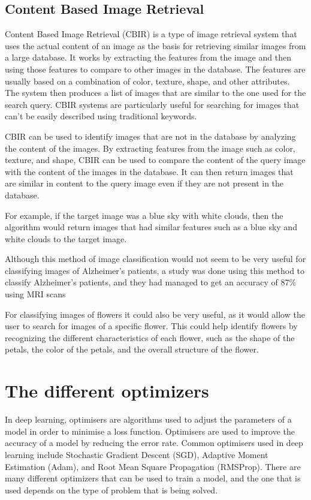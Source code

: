 \documentclass[]{final_report}
\begin{document}
\subsection{Content Based Image Retrieval}
Content Based Image Retrieval (CBIR) is a type of image retrieval system that uses the actual content of an image as the basis for retrieving similar 
images from a large database. It works by extracting the features from the image and then using those features to compare to other images in the database.
The features are usually based on a combination of color, texture, shape, and other attributes. The system then produces a list of images that are similar 
to the one used for the search query. CBIR systems are particularly useful for searching for images that can't be easily described using traditional keywords.

CBIR can be used to identify images that are not in the database by analyzing the content of the images. 
By extracting features from the image such as color, texture, and shape, CBIR can be used to compare the 
content of the query image with the content of the images in the database. It can then return images that are 
similar in content to the query image even if they are not present in the database. 

For example, if the target image was a blue sky with white clouds, then the algorithm would return 
images that had similar features such as a blue sky and white clouds to the target image.

Although this method of image classification would not seem to be very useful for classifying images of Alzheimer's patients, 
a study was done using this method to classify Alzheimer's patients, and they had managed to get an accuracy of 87\% using MRI scans\cite{5972513}

For classifying images of flowers it could also be very useful, as it would allow the user to search for images of a specific flower.
This could help identify flowers by recognizing the different characteristics of each flower, such as the shape of the petals, 
the color of the petals, and the overall structure of the flower.

\section{The different optimizers}

In deep learning, optimisers are algorithms used to adjust the parameters of a model in order to minimise a loss function. 
Optimisers are used to improve the accuracy of a model by reducing the error rate. 
Common optimisers used in deep learning include Stochastic Gradient Descent (SGD),
Adaptive Moment Estimation (Adam), and Root Mean Square Propagation (RMSProp).
There are many different optimizers that can be used to train a model, and the one 
that is used depends on the type of problem that is being solved.
\end{document}
